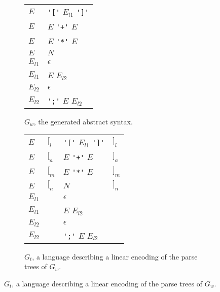 \documentclass[acmsmall,review,anonymous]{acmart}\settopmatter{printfolios=true,printccs=false,printacmref=false}
\begin{document}
\begin{figure}
  \begin{subfigure}[t]{.45\linewidth}
    \centering
    \begin{tabular}{@{}l@{\quad$->$\quad}l@{}}
      \toprule
      $E$ & \verb|'['| $E_{l1}$ \verb|']'| \\
      $E$ & $E$ \verb|'+'| $E$ \\
      $E$ & $E$ \verb|'*'| $E$ \\
      $E$ & $N$ \\
      \midrule
      $E_{l1}$ & $\epsilon$ \\
      $E_{l1}$ & $E$ $E_{l2}$ \\
      \midrule
      $E_{l2}$ & $\epsilon$ \\
      $E_{l2}$ & \verb|';'| $E$ $E_{l2}$ \\
      \bottomrule
    \end{tabular}
    \caption{$G_w$, the generated abstract syntax.}
    \label{fig:running-example-generated:w}
  \end{subfigure}%
%
  \begin{subfigure}[t]{.54\linewidth}
    \centering
    \begin{tabular}{@{}l@{\quad$->$\quad}lll@{}}
      \toprule
      $E$ & $[_{l}$ & \verb|'['| $E_{l1}$ \verb|']'| & $]_{l}$ \\
      $E$ & $[_{a}$ & $E$ \verb|'+'| $E$ & $]_{a}$ \\
      $E$ & $[_{m}$ & $E$ \verb|'*'| $E$ & $]_{m}$ \\
      $E$ & $[_{n}$ & $N$ & $]_{n}$ \\
      \midrule
      $E_{l1}$ & & $\epsilon$ & \\
      $E_{l1}$ & & $E$ $E_{l2}$ & \\
      \midrule
      $E_{l2}$ & & $\epsilon$ & \\
      $E_{l2}$ & & \verb|';'| $E$ $E_{l2}$ & \\
      \bottomrule
    \end{tabular}
    \caption{$G_t$, a language describing a linear encoding of the parse trees of $G_w$.}
    \label{fig:running-example-generated:t}
  \end{subfigure}


\end{figure}
\end{document}
